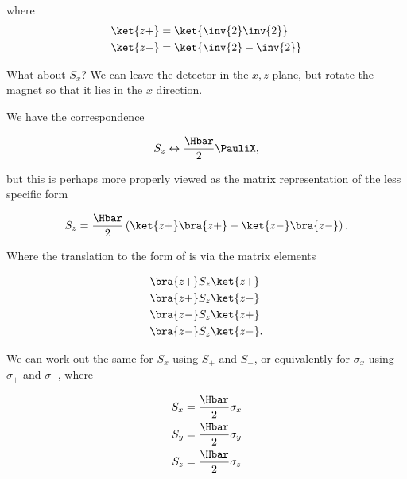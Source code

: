 where
\begin{equation}\label{eqn:PHY356Foct19:2006}
\begin{aligned}
\ket{z+} &= \ket{ \inv{2} \inv{2} } \\
\ket{z-} &= \ket{ \inv{2} -\inv{2} }
\end{aligned}
\end{equation}


What about \(S_x\)?  We can leave the detector in the \(x,z\) plane, but rotate the magnet so that it lies in the \(x\) direction.

We have the correspondence

\begin{equation}\label{eqn:PHY356Foct19:2007}
S_z \leftrightarrow \frac{\Hbar}{2} \PauliX,
\end{equation}

but this is perhaps more properly viewed as the matrix representation of the less specific form

\begin{equation}\label{eqn:PHY356Foct19:2008}
S_z = \frac{\Hbar}{2} \left(
\ket{z+} \bra{z+}
-\ket{z-} \bra{z-}
\right).
\end{equation}

Where the translation to the form of  is via the matrix elements

\begin{equation}\label{eqn:PHY356Foct19:2020}
\begin{aligned}
&\bra{z+} S_z \ket{z+} \\
&\bra{z+} S_z \ket{z-} \\
&\bra{z-} S_z \ket{z+} \\
&\bra{z-} S_z \ket{z-}.
\end{aligned}
\end{equation}

We can work out the same for \(S_x\) using \(S_{+}\) and \(S_{-}\), or equivalently for \(\sigma_x\) using \(\sigma_{+}\) and \(\sigma_{-}\), where

\begin{equation}\label{eqn:PHY356Foct19:2009}
\begin{aligned}
S_x &= \frac{\Hbar}{2} \sigma_x \\
S_y &= \frac{\Hbar}{2} \sigma_y \\
S_z &= \frac{\Hbar}{2} \sigma_z
\end{aligned}
\end{equation}

